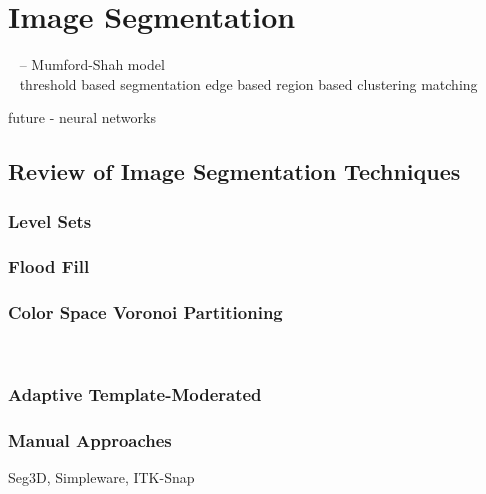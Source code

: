 \chapter{Image Segmentation}
%

~\cite{morel} -- Mumford-Shah model\\
~\cite{mitiche}
threshold based segmentation
edge based
region based
clustering
matching

future - neural networks

\section{Review of Image Segmentation Techniques}
\label{Review of Image Segmentation Techniques}
\subsection{Level Sets}
\label{Level Sets}

\subsection{Flood Fill}
\label{Flood Fill}
\subsection{Color Space Voronoi Partitioning}
\label{Color Space Voronoi Partitioning}
~\cite{lcevt}
\subsection{Adaptive Template-Moderated}
\label{Adaptive Template-Moderated}
\subsection{Manual Approaches}
\label{Manual Approaches}
Seg3D, Simpleware, ITK-Snap

